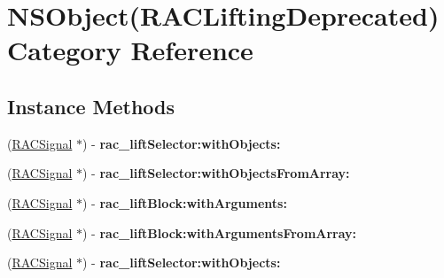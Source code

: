 \hypertarget{category_n_s_object_07_r_a_c_lifting_deprecated_08}{}\section{N\+S\+Object(R\+A\+C\+Lifting\+Deprecated) Category Reference}
\label{category_n_s_object_07_r_a_c_lifting_deprecated_08}
\subsection*{Instance Methods}
\begin{DoxyCompactItemize}
\item 
\mbox{\label{category_n_s_object_07_r_a_c_lifting_deprecated_08_abeb79ac20a04b7094a6d2047716dd13b}} 
(\mbox{\hyperlink{interface_r_a_c_signal}{R\+A\+C\+Signal}} $\ast$) -\/ {\bfseries rac\+\_\+lift\+Selector\+:with\+Objects\+:}
\item 
\mbox{\label{category_n_s_object_07_r_a_c_lifting_deprecated_08_ac21b362d041bcad70936c45e83d0ccde}} 
(\mbox{\hyperlink{interface_r_a_c_signal}{R\+A\+C\+Signal}} $\ast$) -\/ {\bfseries rac\+\_\+lift\+Selector\+:with\+Objects\+From\+Array\+:}
\item 
\mbox{\label{category_n_s_object_07_r_a_c_lifting_deprecated_08_a62c7adb4ffbffc9b46a62351fbe1790b}} 
(\mbox{\hyperlink{interface_r_a_c_signal}{R\+A\+C\+Signal}} $\ast$) -\/ {\bfseries rac\+\_\+lift\+Block\+:with\+Arguments\+:}
\item 
\mbox{\label{category_n_s_object_07_r_a_c_lifting_deprecated_08_a9052f65a819271d2738828ad32d9e1d1}} 
(\mbox{\hyperlink{interface_r_a_c_signal}{R\+A\+C\+Signal}} $\ast$) -\/ {\bfseries rac\+\_\+lift\+Block\+:with\+Arguments\+From\+Array\+:}
\item 
\mbox{\label{category_n_s_object_07_r_a_c_lifting_deprecated_08_abeb79ac20a04b7094a6d2047716dd13b}} 
(\mbox{\hyperlink{interface_r_a_c_signal}{R\+A\+C\+Signal}} $\ast$) -\/ {\bfseries rac\+\_\+lift\+Selector\+:with\+Objects\+:}

\end{DoxyCompactItemize}

